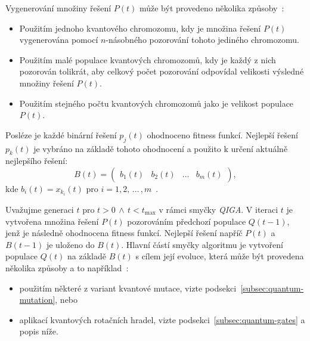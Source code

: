 Vygenerování množiny řešení $P\left(t\right)$ může být provedeno několika způsoby~\cite{NaturalComputing}:
\begin{itemize}
    \item Použitím jednoho kvantového chromozomu, kdy je množina řešení $P\left(t\right)$ vygenerována pomocí $n$-násobného pozorování tohoto jediného chromozomu. 
    \item Použitím malé populace kvantových chromozomů, kdy je každý z nich pozorován tolikrát, aby celkový počet pozorování odpovídal velikosti výsledné množiny řešení $P\left(t\right)$.
    \item Použitím stejného počtu kvantových chromozomů jako je velikost populace $P\left(t\right)$.
\end{itemize}

Posléze je každé binární řešení $p_j\left(t\right)$ ohodnoceno fitness funkcí. 
Nejlepší řešení $p_k\left(t\right)$ je vybráno na základě tohoto ohodnocení a použito k určení aktuálně nejlepšího řešení:
\begin{equation*}
    B\left(t\right) =
    \begin{pmatrix}
        b_1\left(t\right) & b_2\left(t\right) & \dots & b_m\left(t\right)
    \end{pmatrix},
\end{equation*}
kde $b_i\left(t\right) = x_{k_i}\left(t\right)$ pro $i = 1,2,\,\dots\,,m$~\cite{NaturalComputing,qiga}.

Uvažujme generaci $t$ pro $t>0\,\wedge\,t<t_{\text{max}}$ v rámci smyčky \emph{QIGA}. 
V iteraci $t$ je vytvořena množina řešení $P\left(t\right)$ pozorováním předchozí populace $Q\left(t-1\right)$, jenž je následně ohodnocena fitness funkcí. 
Nejlepší řešení napříč $P\left(t\right)$ a $B\left(t-1\right)$ je uloženo do $B\left(t\right)$. 
Hlavní částí smyčky algoritmu je vytvoření populace $Q\left(t\right)$ na základě $B\left(t\right)$ s cílem její evoluce, která může být provedena několika způsoby a to například~\cite{NaturalComputing}:
\begin{itemize}
    \item použitím některé z variant kvantové mutace, vizte podsekci~\ref{subsec:quantum-mutation}, nebo
    \item aplikací kvantových rotačních hradel, vizte podsekci~\ref{subsec:quantum-gates} a popis níže.
\end{itemize}

